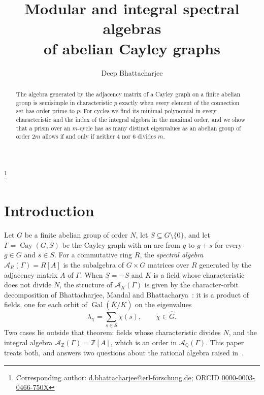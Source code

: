 \documentclass[11pt]{amsart}
\theoremstyle{definition}
\theoremstyle{remark}
\numberwithin{equation}{section}
\newcommand{\Q}{\mathbb{Q}}
\newcommand{\Z}{\mathbb{Z}}
\newcommand{\cA}{\mathcal{A}}
\newcommand{\Cay}{\operatorname{Cay}}
\newcommand{\bK}{\overline{K}}
\begin{document}
\title[Modular and integral spectral algebras]{Modular and integral spectral algebras\\ of abelian Cayley graphs}

\author{Deep Bhattacharjee}
\address{Formerly, Electro-Gravitational Space Propulsion Laboratory (EGSPL),\newline Bhubaneswar, Odisha 751030, India}
\thanks{Corresponding author: \href{mailto:d.bhattacharjee@erl-forschung.de}{d.bhattacharjee@erl-forschung.de}; ORCID \href{https://orcid.org/0000-0003-0466-750X}{\mbox{0000-0003-0466-750X}}}


\begin{abstract}
The algebra generated by the adjacency matrix of a Cayley graph on a finite abelian group is semisimple in characteristic $p$ exactly when every element of the connection set has order prime to $p$. For cycles we find its minimal polynomial in every characteristic and the index of the integral algebra in the maximal order, and we show that a prism over an $m$-cycle has as many distinct eigenvalues as an abelian group of order $2m$ allows if and only if neither $4$ nor $6$ divides $m$.
\end{abstract}

\maketitle

\section{Introduction}

Let $G$ be a finite abelian group of order $N$, let $S\subseteq G\setminus\{0\}$, and let $\Gamma=\Cay(G,S)$ be the Cayley graph with an arc from $g$ to $g+s$ for every $g\in G$ and $s\in S$. For a commutative ring $R$, the \emph{spectral algebra} $\cA_R(\Gamma)=R[A]$ is the subalgebra of $G\times G$ matrices over $R$ generated by the adjacency matrix $A$ of $\Gamma$. When $S=-S$ and $K$ is a field whose characteristic does not divide $N$, the structure of $\cA_K(\Gamma)$ is given by the character-orbit decomposition of Bhattacharjee, Mandal and Bhattacharya~\cite[Theorem~6.1]{BMB}: it is a product of fields, one for each orbit of $\operatorname{Gal}(\bK/K)$ on the eigenvalues
\[
\lambda_\chi=\sum_{s\in S}\chi(s),\qquad \chi\in\widehat G .
\]
Two cases lie outside that theorem: fields whose characteristic divides $N$, and the integral algebra $\cA_\Z(\Gamma)=\Z[A]$, which is an order in $\cA_\Q(\Gamma)$. This paper treats both, and answers two questions about the rational algebra raised in~\cite{BMB}.
\end{document}
